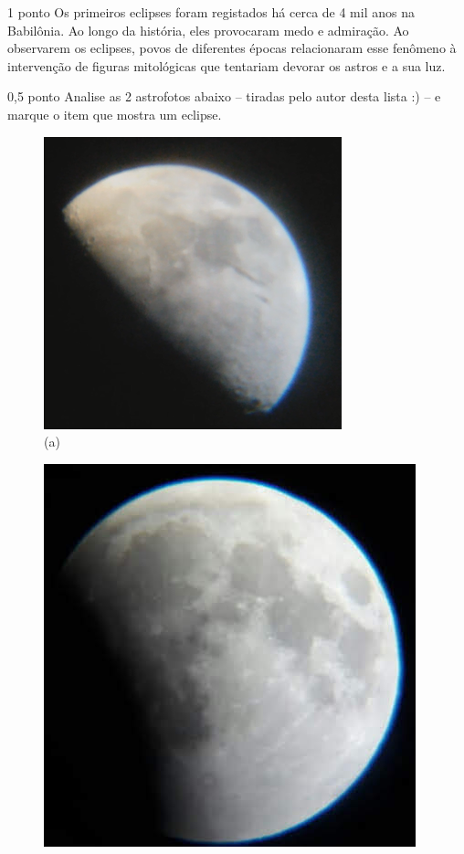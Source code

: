 \documentclass{../lista}
\begin{document}

	\begin{questao}{1 ponto}
		Os primeiros eclipses foram registados há cerca de 4 mil anos na Babilônia. Ao longo da história, eles provocaram medo e admiração. Ao observarem os eclipses, povos de diferentes épocas relacionaram esse fenômeno à intervenção de figuras mitológicas que tentariam devorar os astros e a sua luz.

		\begin{pergunta}{0,5 ponto}
			Analise as 2 astrofotos abaixo -- tiradas pelo autor desta lista :) -- e marque o item que mostra um eclipse.
			\begin{multicols}{2}
				\begin{figure}[H]
					\centering
					\includegraphics[width=.6\linewidth]{img/1a.png}
					\captionsetup{labelformat=empty}
					\caption{(a)}
					\end{figure}
				\begin{figure}[H]
					\centering
					\includegraphics[width=.6\linewidth]{img/1b.jpg}
					\captionsetup{labelformat=empty}
					\caption{}
				\end{figure}
			\end{multicols}


\end{pergunta}
\end{questao}
\end{document}
